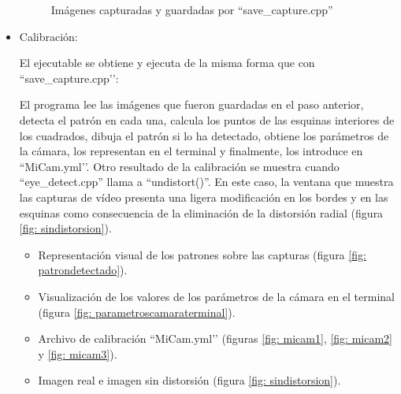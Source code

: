 \begin{itemize}
\begin{figure}[htbp]
\caption{Imágenes capturadas y guardadas por ``save\_capture.cpp''} 
\label{fig: imagenessavecapture}
\end{figure}
\clearpage
    \item Calibración:

El ejecutable se obtiene y ejecuta de la misma forma que con ``save\_capture.cpp’’: \\


El programa lee las imágenes que fueron guardadas en el paso anterior, detecta el patrón en cada una, calcula los puntos de las esquinas interiores de los cuadrados, dibuja el patrón si lo ha detectado, obtiene los parámetros de la cámara, los representan en el terminal y finalmente, los introduce en ``MiCam.yml’’. Otro resultado de la calibración se muestra cuando ``eye\_detect.cpp'' llama a ``undistort()''. En este caso, la ventana que muestra las capturas de vídeo presenta una ligera modificación en los bordes y en las esquinas como consecuencia de la eliminación de la distorsión radial (figura \ref{fig: sindistorsion}).

\begin{itemize}
    \item Representación visual de los patrones sobre las capturas (figura \ref{fig: patrondetectado}).
    \item Visualización de los valores de los parámetros de la cámara en el terminal (figura \ref{fig: parametroscamaraterminal}).
    \item Archivo de calibración ``MiCam.yml’’ (figuras \ref{fig: micam1}, \ref{fig: micam2} y \ref{fig: micam3}). 
    \item Imagen real e imagen sin distorsión (figura \ref{fig: sindistorsion}).\\
\end{itemize}
\end{itemize}

